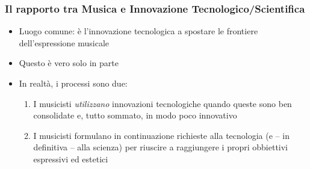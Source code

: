 \begin{frame}
    \frametitle<+- | alert@+->{Il rapporto tra Musica e Innovazione Tecnologico/Scientifica}

    \begin{itemize}[<+- | alert@+->]
        \item Luogo comune: \`e l'innovazione tecnologica a spostare le
            frontiere dell'espressione musicale
        \item Questo \`e vero solo in parte
        \item In realt\`a, i processi sono due:
            \begin{enumerate}[<+- | alert@+->]
                \item I musicisti \emph{utilizzano} innovazioni tecnologiche
                    quando queste sono ben consolidate e, tutto sommato, in
                    modo poco innovativo
                \item I musicisti formulano in continuazione richieste alla
                    tecnologia (e -- in definitiva -- alla scienza) per
                    riuscire a raggiungere i propri obbiettivi espressivi ed
                    estetici
            \end{enumerate}
    \end{itemize}

\end{frame}


